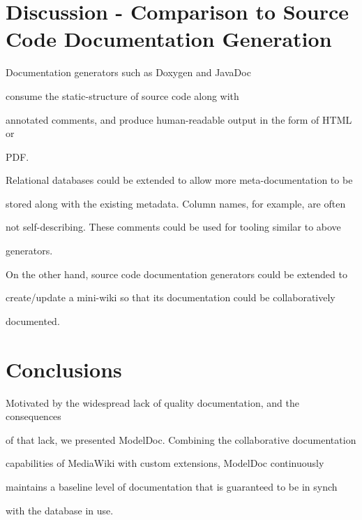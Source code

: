 \documentclass{acm_proc_article-sp}
\begin{document}
\section{Discussion - Comparison to Source Code Documentation Generation}



Documentation generators such as Doxygen \cite{web:doxygen} and JavaDoc

\cite{web:javadoc} consume the static-structure of source code along with

annotated comments, and produce human-readable output in the form of HTML or

PDF.



Relational databases could be extended to allow more meta-documentation to be

stored along with the existing metadata.  Column names, for example, are often

not self-describing.  These comments could be used for tooling similar to above

generators.



On the other hand, source code documentation generators could be extended to

create/update a mini-wiki so that its documentation could be collaboratively

documented.



\section{Conclusions}

Motivated by the widespread lack of quality documentation, and the consequences

of that lack, we presented ModelDoc.  Combining the collaborative documentation

capabilities of MediaWiki with custom extensions, ModelDoc continuously

maintains a baseline level of documentation that is guaranteed to be in synch

with the database in use.







\balancecolumns
\end{document}
